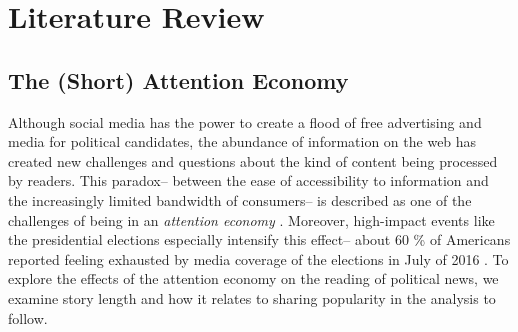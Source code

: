 \documentclass[letterpaper]{article}
\begin{document}
\section{Literature Review}


  
\subsection{The (Short) Attention Economy}
Although social media has the power to create a flood of free advertising and media for political candidates, the abundance of information on the web has created new challenges and questions about the kind of content being processed by readers. This paradox-- between the ease of accessibility to information and the increasingly limited bandwidth of consumers-- is described as one of the challenges of being in an \emph{attention economy} \cite{goldhaber1997attention}. Moreover, high-impact events like the presidential elections especially intensify this effect-- about 60 \% of Americans reported feeling exhausted by media coverage of the elections in July of 2016 \cite{election-fatigue}. To explore the effects of the attention economy on the reading of political news, we examine story length and how it relates to sharing popularity in the analysis to follow.
 
\end{document}
